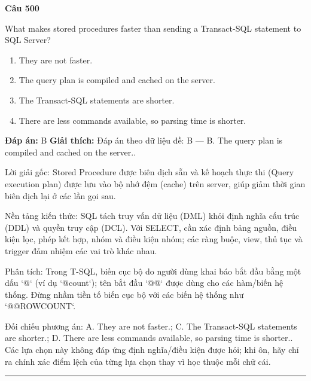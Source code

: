 \documentclass[11pt,a4paper]{article}
\newenvironment{question}[1]{%
  \par\vspace{1em}\noindent\textbf{\large Câu #1}\par\vspace{0.4em}
}{%
  \par\vspace{1em}\hrule\vspace{0.6em}
}
\newenvironment{choices}{%
  \begin{enumerate}[label=\textbf{\Alph*.},leftmargin=2.2em,itemsep=2pt,topsep=3pt]
}{%
  \end{enumerate}
}
\newcommand{\choice}{\item}
\begin{document}
\begin{question}{500}
What makes stored procedures faster than sending a Transact-SQL statement to SQL Server?
\begin{choices}
\choice They are not faster.
\choice The query plan is compiled and cached on the server.
\choice The Transact-SQL statements are shorter.
\choice There are less commands available, so parsing time is shorter.
\end{choices}
\textbf{Đáp án:} B
\textbf{Giải thích:} Đáp án theo dữ liệu đề: B — B. The query plan is compiled and cached on the server..

Lời giải gốc: Stored Procedure được biên dịch sẵn và kế hoạch thực thi (Query execution plan) được lưu vào bộ nhớ đệm (cache) trên server, giúp giảm thời gian biên dịch lại ở các lần gọi sau.

Nền tảng kiến thức: SQL tách truy vấn dữ liệu (DML) khỏi định nghĩa cấu trúc (DDL) và quyền truy cập (DCL). Với SELECT, cần xác định bảng nguồn, điều kiện lọc, phép kết hợp, nhóm và điều kiện nhóm; các ràng buộc, view, thủ tục và trigger đảm nhiệm các vai trò khác nhau.

Phân tích: Trong T-SQL, biến cục bộ do người dùng khai báo bắt đầu bằng một dấu `@` (ví dụ `@count`); tên bắt đầu `@@` được dùng cho các hàm/biến hệ thống. Đừng nhầm tiền tố biến cục bộ với các biến hệ thống như `@@ROWCOUNT`.

Đối chiếu phương án: A. They are not faster.; C. The Transact-SQL statements are shorter.; D. There are less commands available, so parsing time is shorter.. Các lựa chọn này không đáp ứng định nghĩa/điều kiện được hỏi; khi ôn, hãy chỉ ra chính xác điểm lệch của từng lựa chọn thay vì học thuộc mỗi chữ cái.
\end{question}
\end{document}
